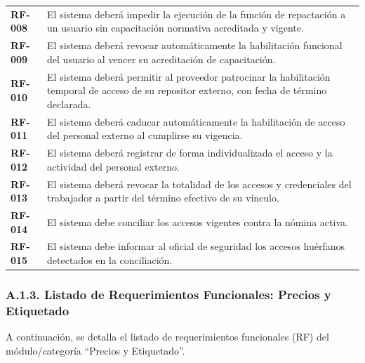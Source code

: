 \documentclass[11pt]{article}
\begin{document}
\begin{longtable}[]{@{}
  >{\raggedright\arraybackslash}p{}
  >{\raggedright\arraybackslash}p{}@{}}
\addlinespace[2pt]
\textbf{RF-008} & El sistema deberá impedir la ejecución de la función de repactación a un usuario sin capacitación normativa acreditada y vigente. \\
\addlinespace[2pt]
\textbf{RF-009} & El sistema deberá revocar automáticamente la habilitación funcional del usuario al vencer su acreditación de capacitación. \\
\addlinespace[2pt]
\textbf{RF-010} & El sistema deberá permitir al proveedor patrocinar la habilitación temporal de acceso de su repositor externo, con fecha de término declarada. \\
\addlinespace[2pt]
\textbf{RF-011} & El sistema deberá caducar automáticamente la habilitación de acceso del personal externo al cumplirse su vigencia. \\
\addlinespace[2pt]
\textbf{RF-012} & El sistema deberá registrar de forma individualizada el acceso y la actividad del personal externo. \\
\addlinespace[2pt]
\textbf{RF-013} & El sistema deberá revocar la totalidad de los accesos y credenciales del trabajador a partir del término efectivo de su vínculo. \\
\addlinespace[2pt]
\textbf{RF-014} & El sistema debe conciliar los accesos vigentes contra la nómina activa. \\
\addlinespace[2pt]
\textbf{RF-015} & El sistema debe informar al oficial de seguridad los accesos huérfanos detectados en la conciliación. \\
\end{longtable}

\subsubsection{A.1.3. Listado de Requerimientos Funcionales: Precios y Etiquetado}\label{a-1-3-listado-de-requerimientos-funcionales-precios-y-etiquetado}

A continuación, se detalla el listado de requerimientos funcionales (RF) del módulo/categoría ``Precios y Etiquetado''.
\end{document}
